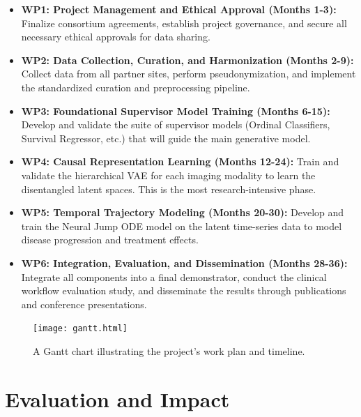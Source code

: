 \documentclass[11pt, a4paper]{article}
\begin{document}
\begin{itemize}
    \item \textbf{WP1: Project Management and Ethical Approval (Months 1-3):} Finalize consortium agreements, establish project governance, and secure all necessary ethical approvals for data sharing.
    \item \textbf{WP2: Data Collection, Curation, and Harmonization (Months 2-9):} Collect data from all partner sites, perform pseudonymization, and implement the standardized curation and preprocessing pipeline.
    \item \textbf{WP3: Foundational Supervisor Model Training (Months 6-15):} Develop and validate the suite of supervisor models (Ordinal Classifiers, Survival Regressor, etc.) that will guide the main generative model.
    \item \textbf{WP4: Causal Representation Learning (Months 12-24):} Train and validate the hierarchical VAE for each imaging modality to learn the disentangled latent spaces. This is the most research-intensive phase.
    \item \textbf{WP5: Temporal Trajectory Modeling (Months 20-30):} Develop and train the Neural Jump ODE model on the latent time-series data to model disease progression and treatment effects.
    \item \textbf{WP6: Integration, Evaluation, and Dissemination (Months 28-36):} Integrate all components into a final demonstrator, conduct the clinical workflow evaluation study, and disseminate the results through publications and conference presentations.
\end{itemize}

\begin{figure}[H]
    \centering
    \texttt{[image: gantt.html]}
    \caption{A Gantt chart illustrating the project's work plan and timeline.}
    \label{fig:gantt}
\end{figure}

\section{Evaluation and Impact}
\end{document}
